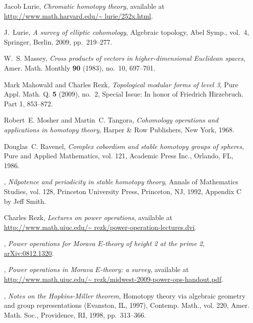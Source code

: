 \documentclass{gtpart}
\theoremstyle{definition}
\theoremstyle{remark}
\begin{document}
\begin{thebibliography}
Jacob Lurie, \emph{Chromatic homotopy theory}, available at
  \href{http://www.math.harvard.edu/~lurie/252x.html}{http://www.math.harvard.edu/\textasciitilde
  lurie/252x.html}.

J.~Lurie, \emph{A survey of elliptic cohomology}, Algebraic topology, Abel
  Symp., vol.~4, Springer, Berlin, 2009, pp.~219--277. 

W.~S. Massey, \emph{Cross products of vectors in higher-dimensional {E}uclidean
  spaces}, Amer. Math. Monthly \textbf{90} (1983), no.~10, 697--701. 

Mark Mahowald and Charles Rezk, \emph{Topological modular forms of level 3},
  Pure Appl. Math. Q. \textbf{5} (2009), no.~2, Special Issue: In honor of
  Friedrich Hirzebruch. Part 1, 853--872. 

Robert~E. Mosher and Martin~C. Tangora, \emph{Cohomology operations and
  applications in homotopy theory}, Harper \& Row Publishers, New York, 1968.

Douglas~C. Ravenel, \emph{Complex cobordism and stable homotopy groups of
  spheres}, Pure and Applied Mathematics, vol. 121, Academic Press Inc.,
  Orlando, FL, 1986. 

\bysame, \emph{Nilpotence and periodicity in stable homotopy theory}, Annals of
  Mathematics Studies, vol. 128, Princeton University Press, Princeton, NJ,
  1992, Appendix C by Jeff Smith. 

Charles Rezk, \emph{Lectures on power operations}, available at
  \href{http://www.math.uiuc.edu/~rezk/power-operation-lectures.dvi}{http://www.math.uiuc.edu/\textasciitilde
  rezk/power-operation-lectures.dvi}.

\bysame, \emph{Power operations for {M}orava ${E}$-theory of height 2 at the
  prime 2}, \href{http://arxiv.org/abs/0812.1320}{arXiv:0812.1320}.

\bysame, \emph{Power operations in {M}orava ${E}$-theory: a survey}, available
  at
  \href{http://www.math.uiuc.edu/~rezk/midwest-2009-power-ops-handout.pdf}{http://www.math.uiuc.edu/\textasciitilde
  rezk/midwest-2009-power-ops-handout.pdf}.

\bysame, \emph{Notes on the {H}opkins-{M}iller theorem}, Homotopy theory via
  algebraic geometry and group representations ({E}vanston, {IL}, 1997),
  Contemp. Math., vol. 220, Amer. Math. Soc., Providence, RI, 1998,
  pp.~313--366. 


\end{thebibliography}
\end{document}
